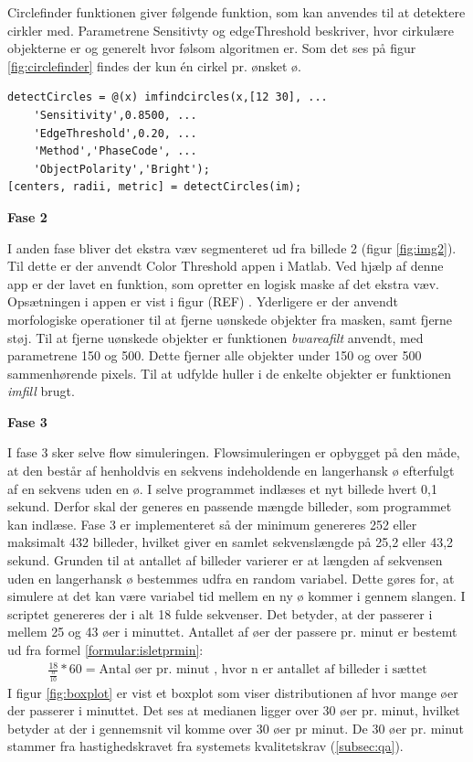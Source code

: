 Circlefinder funktionen giver følgende funktion, som kan anvendes til at detektere cirkler med. Parametrene Sensitivty og edgeThreshold beskriver, hvor cirkulære objekterne er og generelt hvor følsom algoritmen er. Som det ses på figur \ref{fig:circlefinder} findes der kun én cirkel pr. ønsket ø.
\begin{lstlisting} 
detectCircles = @(x) imfindcircles(x,[12 30], ...
	'Sensitivity',0.8500, ...
	'EdgeThreshold',0.20, ...
	'Method','PhaseCode', ...
	'ObjectPolarity','Bright');
[centers, radii, metric] = detectCircles(im);
\end{lstlisting} 


\textbf{Fase 2}

I anden fase bliver det ekstra væv segmenteret ud fra billede 2 (figur \ref{fig:img2}). Til dette er der anvendt Color Threshold appen i Matlab. Ved hjælp af denne app er der lavet en funktion, som opretter en logisk maske af det ekstra væv. Opsætningen i appen er vist i figur (REF) . Yderligere er der anvendt morfologiske operationer til at fjerne uønskede objekter fra masken, samt fjerne støj. Til at fjerne uønskede objekter er funktionen \textit{bwareafilt} anvendt, med parametrene 150 og 500. Dette fjerner alle objekter under 150 og over 500 sammenhørende pixels. Til at udfylde huller i de enkelte objekter er funktionen \textit{imfill} brugt. 

\textbf{Fase 3}

I fase 3 sker selve flow simuleringen. Flowsimuleringen er opbygget på den måde, at den består af henholdvis en sekvens indeholdende en langerhansk ø efterfulgt af en sekvens uden en ø. I selve programmet indlæses et nyt billede hvert 0,1 sekund. Derfor skal der generes en passende mængde billeder, som programmet kan indlæse. Fase 3 er implementeret så der minimum genereres 252 eller maksimalt 432 billeder, hvilket giver en samlet sekvenslængde på 25,2 eller 43,2 sekund. Grunden til at antallet af billeder varierer er at længden af sekvensen uden en langerhansk ø bestemmes udfra en random variabel. Dette gøres for, at simulere at det kan være variabel tid mellem en ny ø kommer i gennem slangen. I scriptet genereres der i alt 18 fulde sekvenser. Det betyder, at der passerer i mellem 25 og 43 øer i minuttet. Antallet af øer der passere pr. minut er bestemt ud fra formel \ref{formular:isletprmin}: 
\begin{align}
\frac{18}{\frac{n}{10}} * 60 = \text{Antal øer pr. minut}
\text{ , hvor n er antallet af billeder i sættet}
\label{formular:isletprmin}
\end{align} 
I figur \ref{fig:boxplot} er vist et boxplot som viser distributionen af hvor mange øer der passerer i minuttet. Det ses at medianen ligger over 30 øer pr. minut, hvilket betyder at der i gennemsnit vil komme over 30 øer pr minut. De 30 øer pr. minut stammer fra hastighedskravet fra systemets kvalitetskrav (\ref{subsec:qa}).

